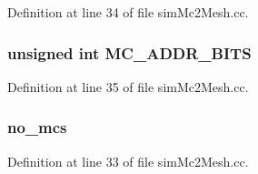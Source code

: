 Definition at line 34 of file simMc2Mesh.cc.
\subsubsection[{MC\_\-ADDR\_\-BITS}]{\setlength{\rightskip}{0pt plus 5cm}unsigned int {\bf MC\_\-ADDR\_\-BITS}}\label{mshr__clubbed_8h_5797f7fc969d8a7c02df4ba708ed734f}




Definition at line 35 of file simMc2Mesh.cc.
\subsubsection[{no\_\-mcs}]{ {\bf no\_\-mcs}}\label{mshr__clubbed_8h_56d27d790e05179f3787fce80d802d04}




Definition at line 33 of file simMc2Mesh.cc.